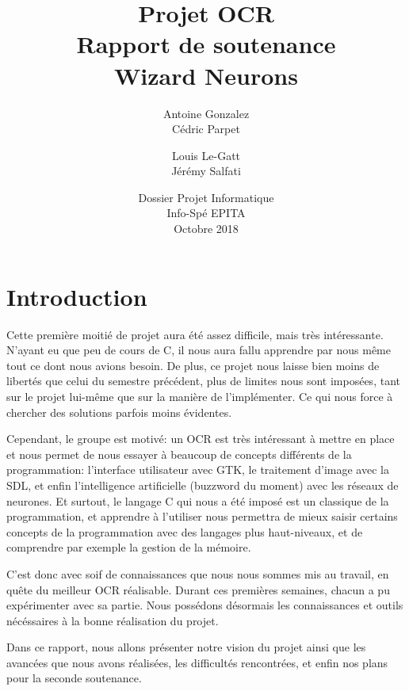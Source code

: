 \documentclass[12pt]{report}
\begin{document}
\title{
	{\Huge Projet OCR}\\
	\vspace{2em}
	{\Huge Rapport de soutenance}\\
	{\large Wizard Neurons}
}
\author{
	Antoine Gonzalez\\
	Cédric Parpet
	\and
	Louis Le-Gatt\\
	Jérémy Salfati}
\date{
	\vspace{15em}
	{Dossier Projet Informatique\\
	Info-Spé EPITA\\
	Octobre 2018}
}

\maketitle
\newpage
\newpage
\tableofcontents

\chapter{Introduction}

Cette première moitié de projet aura été assez difficile, mais très intéressante. N'ayant eu que peu de cours de C, il nous aura fallu apprendre par nous même tout ce dont nous avions besoin. De plus, ce projet nous laisse bien moins de libertés que celui du semestre précédent, plus de limites nous sont imposées, tant sur le projet lui-même que sur la manière de l'implémenter. Ce qui nous force à chercher des solutions parfois moins évidentes.

Cependant, le groupe est motivé: un OCR est très intéressant à mettre en place et nous permet de nous essayer à beaucoup de concepts différents de la programmation: l'interface utilisateur avec GTK, le traitement d'image avec la SDL, et enfin l'intelligence artificielle (buzzword du moment) avec les réseaux de neurones. Et surtout, le langage C qui nous a été imposé est un classique de la programmation, et apprendre à l'utiliser nous permettra de mieux saisir certains concepts de la programmation avec des langages plus haut-niveaux, et de comprendre par exemple la gestion de la mémoire.

C'est donc avec soif de connaissances que nous nous sommes mis au travail, en quête du meilleur OCR réalisable. Durant ces premières semaines, chacun a pu expérimenter avec sa partie. Nous possédons désormais les connaissances et outils nécéssaires à la bonne réalisation du projet.

Dans ce rapport, nous allons présenter notre vision du projet ainsi que les avancées que nous avons réalisées, les difficultés rencontrées, et enfin nos plans pour la seconde soutenance.
\end{document}
